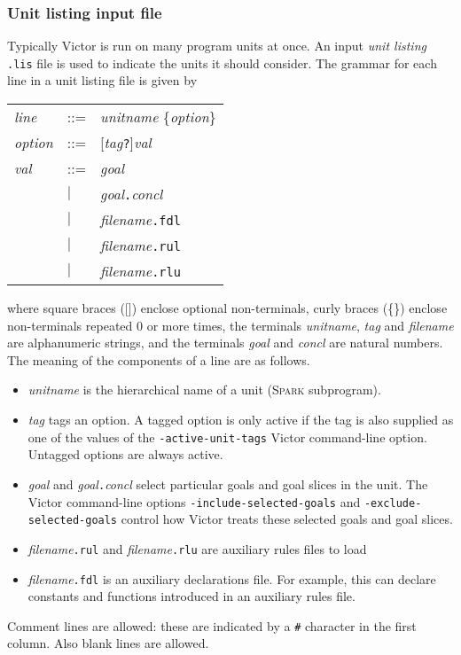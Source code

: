 \documentclass[12pt,fleqn]{article}
\newcommand{\spark}{\textsc{Spark}}
\begin{document}
\subsubsection{Unit listing input file}
\label{sec:unit-listing-file}

Typically Victor is run on many program units at once.  An input
\emph{unit listing} \texttt{.lis} file is used to indicate the units
it should consider.  
%
The grammar for each line in a unit listing file is given by

\noindent
\begin{tabular}{lll}
\textit{line}  & ::= & \textit{unitname} \{\textit{option}\}  \\[2ex]
%
\textit{option} & ::= & [\textit{tag}\texttt{?}]\textit{val} \\[2ex]
%
\textit{val} & ::= &  \textit{goal} \\
    & $|$  &  \textit{goal}\texttt{.}\textit{concl} \\
    & $|$  &  \textit{filename}\texttt{.fdl} \\
    & $|$  &  \textit{filename}\texttt{.rul} \\
    & $|$  &  \textit{filename}\texttt{.rlu} 
\end{tabular}

\noindent
where square braces ([]) enclose optional non-terminals,
curly braces (\{\}) enclose non-terminals repeated 0 or more times,
%
the terminals \textit{unitname}, \textit{tag} and \textit{filename} are
alphanumeric strings, 
and the terminals \textit{goal} and \textit{concl} are natural numbers.
%
The meaning of the components of a line are as follows.
\begin{itemize}
\item \textit{unitname} is the hierarchical name of a unit (\spark{}
  subprogram).

\item \textit{tag} tags an option.  A tagged option is only active if
  the tag is also supplied as one of the values of the 
  \texttt{-active-unit-tags} Victor command-line option.
  Untagged options are always active.

\item \textit{goal} and \textit{goal}\texttt{.}\textit{concl} 
  select particular goals and goal slices in the unit. 
  The Victor command-line options 
  \texttt{-include-selected-goals} and
  \texttt{-exclude-selected-goals}
  control how Victor treats these selected goals and goal slices.

\item \textit{filename}\texttt{.rul} and
      \textit{filename}\texttt{.rlu} are auxiliary rules files to load

\item \textit{filename}\texttt{.fdl} is an auxiliary declarations file.
  For example, this can declare constants and functions introduced in 
  an auxiliary rules file.
\end{itemize}
Comment lines are allowed: these are indicated by a \texttt{\#}
character in the first column.  Also blank lines are allowed.  
\end{document}
